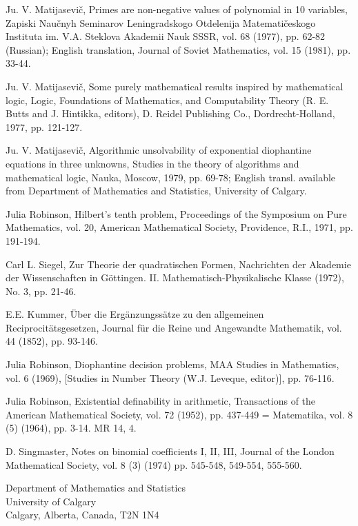 \documentclass[11pt,a4paper]{article}
\begin{document}
\begin{list}{}{\setlength{\leftmargin}{2.4em}\setlength{\labelwidth}{2em}\setlength{\labelsep}{.4em}\setlength{\itemsep}{.5em}}
\item[\textup{[18]}] Ju. V. Matijasevič, Primes are non-negative values of polynomial in 10 variables, Zapiski Naučnyh Seminarov Leningradskogo Otdelenija Matematičeskogo Instituta im. V.A. Steklova Akademii Nauk SSSR, vol. 68 (1977), pp. 62-82 (Russian); English translation, Journal of Soviet Mathematics, vol. 15 (1981), pp. 33-44.
\item[\textup{[19]}] Ju. V. Matijasevič, Some purely mathematical results inspired by mathematical logic, Logic, Foundations of Mathematics, and Computability Theory (R. E. Butts and J. Hintikka, editors), D. Reidel Publishing Co., Dordrecht-Holland, 1977, pp. 121-127.
\item[\textup{[20]}] Ju. V. Matijasevič, Algorithmic unsolvability of exponential diophantine equations in three unknowns, Studies in the theory of algorithms and mathematical logic, Nauka, Moscow, 1979, pp. 69-78; English transl. available from Department of Mathematics and Statistics, University of Calgary.
\item[\textup{[21]}] Julia Robinson, Hilbert's tenth problem, Proceedings of the Symposium on Pure Mathematics, vol. 20, American Mathematical Society, Providence, R.I., 1971, pp. 191-194.
\item[\textup{[22]}] Carl L. Siegel, Zur Theorie der quadratischen Formen, Nachrichten der Akademie der Wissenschaften in Göttingen. II. Mathematisch-Physikalische Klasse (1972), No. 3, pp. 21-46.
\item[\textup{[23]}] E.E. Kummer, Über die Ergänzungssätze zu den allgemeinen Reciprocitätsgesetzen, Journal für die Reine und Angewandte Mathematik, vol. 44 (1852), pp. 93-146.
\item[\textup{[24]}] Julia Robinson, Diophantine decision problems, MAA Studies in Mathematics, vol. 6 (1969), [Studies in Number Theory (W.J. Leveque, editor)], pp. 76-116.
\item[\textup{[25]}] Julia Robinson, Existential definability in arithmetic, Transactions of the American Mathematical Society, vol. 72 (1952), pp. 437-449 = Matematika, vol. 8 (5) (1964), pp. 3-14. MR 14, 4.
\item[\textup{[26]}] D. Singmaster, Notes on binomial coefficients I, II, III, Journal of the London Mathematical Society, vol. 8 (3) (1974) pp. 545-548, 549-554, 555-560.

\end{list}\normalsize\bigskip
\noindent Department of Mathematics and Statistics\\
University of Calgary\\
Calgary, Alberta, Canada, T2N 1N4
\end{document}
